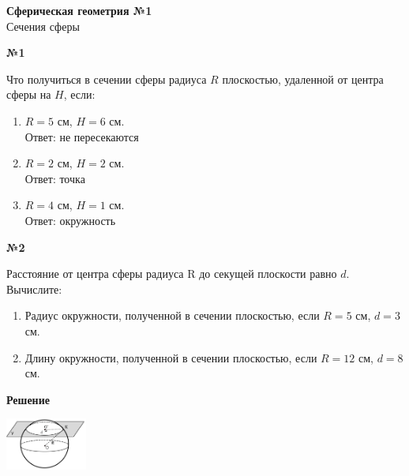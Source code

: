 


    \begin{center}
        \textbf{Сферическая геометрия №1}\\
        Сечения сферы
    \end{center}

    \begin{center}
        \textbf{№1}
    \end{center}

    Что получиться в сечении сферы радиуса $R$ плоскостью, удаленной от центра сферы на $H$, если:\\

    \begin{enumerate}
        \setcounter{enumi}{0}
        \item $R = 5$ см, $H = 6$ см.\\
        Ответ: не пересекаются

        \item $R = 2$ см, $H = 2$ см.\\
        Ответ: точка

        \item $R = 4$ см, $H = 1$ см.\\
        Ответ: окружность

    \end{enumerate}

    \begin{center}
        \textbf{№2}
    \end{center}

    Расстояние от центра сферы радиуса R до секущей плоскости равно $d$.
    Вычислите:
    \begin{enumerate}
        \item Радиус окружности, полученной в сечении плоскостью, если $R = 5$ см, $d = 3$ см.
        \item Длину окружности, полученной в сечении плоскостью, если $R = 12$ см, $d = 8$ см.
    \end{enumerate}

    \textbf{Решение}\\

    \begin{center}
        \includegraphics[width=0.2\textwidth]{images/img1}\\
    \end{center}

